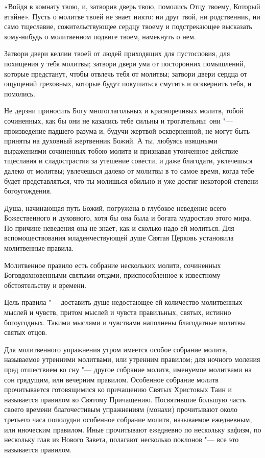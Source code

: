 «Войдя в комнату твою, и, затворив дверь твою, помолись Отцу твоему, Который втайне». Пусть о молитве твоей не знает никто: ни друг твой, ни родственник, ни само тщеславие, сожительствующее сердцу твоему и подстрекающее высказать кому-нибудь о молитвенном подвиге твоем, намекнуть о нем.

Затвори двери келлии твоей от людей приходящих для пустословия, для похищения у тебя молитвы; затвори двери ума от посторонних помышлений, которые предстанут, чтобы отвлечь тебя от молитвы; затвори двери сердца от ощущений греховных, которые будут покушаться смутить и осквернить тебя, и помолись.

Не дерзни приносить Богу многоглагольных и красноречивых молитв, тобой сочиненных, как бы они не казались тебе сильны и трогательны: они "--- произведение падшего разума и, будучи жертвой оскверненной, не могут быть приняты на духовный жертвенник Божий. А ты, любуясь изящными выражениями сочиненных тобою молитв и признавая утонченное действие тщеславия и сладострастия за утешение совести, и даже благодати, увлечешься далеко от молитвы; увлечешься далеко от молитвы в то самое время, когда тебе будет представляться, что ты молишься обильно и уже достиг некоторой степени богоугождения.

Душа, начинающая путь Божий, погружена в глубокое неведение всего Божественного и духовного, хотя бы она была и богата мудростию этого мира. По причине неведения она не знает, как и сколько надо ей молиться. Для вспомоществования младенчествующей душе Святая Церковь установила молитвенные правила.

Молитвенное правило есть собрание нескольких молитв, сочиненных Боговдохновенными святыми отцами, приспособленное к известному обстоятельству и времени.

Цель правила "--- доставить душе недостающее ей количество молитвенных мыслей и чувств, притом мыслей и чувств правильных, святых, истинно богоугодных. Такими мыслями и чувствами наполнены благодатные молитвы святых отцов.

Для молитвенного упражнения утром имеется особое собрание молитв, называемое утренними молитвами, или утренним правилом; для ночного моления пред отшествием ко сну "--- другое собрание молитв, именуемое молитвами на сон грядущим, или вечерним правилом. Особенное собрание молитв прочитывается готовящимися ко причащению Святых Христовых Таин и называется правилом ко Святому Причащению. Посвятившие большую часть своего времени благочестивым упражнениям (монахи) прочитывают около третьего часа пополудни особенное собрание молитв, называемое ежедневным, или иноческим правилом. Иные прочитывают ежедневно по нескольку кафизм, по нескольку глав из Нового Завета, полагают несколько поклонов "--- все это называется правилом.

